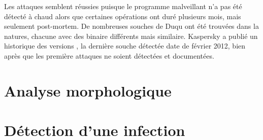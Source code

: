 Les attaques semblent réussies puisque le programme malveillant n'a pas été détecté à chaud alors que certaines opérations ont duré plusieurs mois, mais seulement post-mortem. De nombreuses souches de Duqu ont été trouvées dans la natures, chacune avec des binaire différents mais similaire. Kaspersky a publié un historique des versions \cite{KaspDuqu10}, la dernière souche détectée date de février 2012, bien après que les première attaques ne soient détectées et documentées.

\section{Analyse morphologique}

\section{Détection d'une infection}